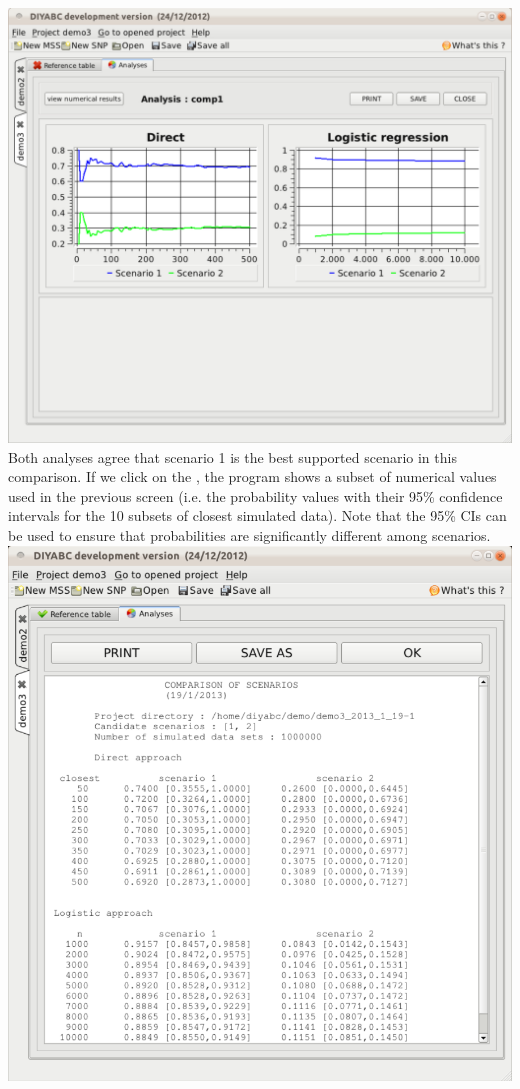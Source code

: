 \includegraphics[scale=0.3]{gui_pictures/Capture-DIYABC-111} \\


Both analyses agree that scenario 1 is the best supported scenario
in this comparison. If we click on the , the program shows a subset of numerical values used in
the previous screen (i.e. the probability values with their 95\% confidence
intervals for the 10 subsets of closest simulated data). Note that
the 95\% CIs can be used to ensure that probabilities are significantly
different among scenarios.\\


\includegraphics[scale=0.3]{gui_pictures/Capture-DIYABC-112} \\



